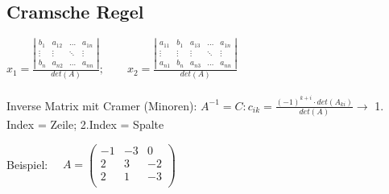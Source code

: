 \subsection{Cramsche Regel}
	$x_1= \frac{\left|\begin{array}{cccc}
		b_1 & a_{12} & \ldots & a_{1n} \\
		\vdots & \vdots & \ddots & \vdots \\
		b_n & a_{n2} & \ldots & a_{nn} \end{array}\right|}{det(A)}; \qquad
	x_2 = \frac{\left|\begin{array}{ccccc}
		a_{11} & b_1 & a_{13} & \ldots & a_{1n}\\
		\vdots & \vdots & \vdots & \ddots & \vdots \\
		a_{n1} & b_n & a_{n3} & \ldots & a_{nn} \end{array}\right|}{det(A)}$ \\ \\
	Inverse Matrix mit Cramer (Minoren): $A^{-1} = C : c_{ik} = \frac{(-1)^{k+i} \cdot det(A_{ki})}{det(A)} \longrightarrow$ 1. Index = Zeile; 2.Index = Spalte
	
	Beispiel: \ \ 
		$A=\left(\begin{array}{rrr} 
				-1 & -3 & 0 \\
				2 & 3 & -2 \\
				2 & 1 & -3 \\
			\end{array}\right)$ \\ \ \\
			
